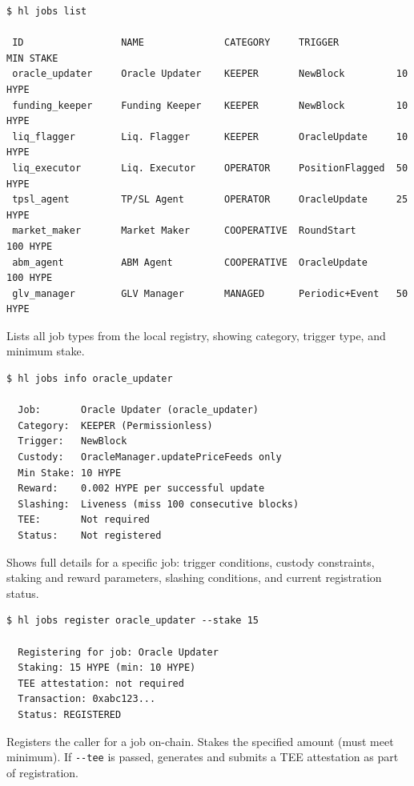 \documentclass[11pt,a4paper]{article}
\begin{document}
\begin{clibox}
\begin{lstlisting}
$ hl jobs list

 ID                 NAME              CATEGORY     TRIGGER          MIN STAKE
 oracle_updater     Oracle Updater    KEEPER       NewBlock         10 HYPE
 funding_keeper     Funding Keeper    KEEPER       NewBlock         10 HYPE
 liq_flagger        Liq. Flagger      KEEPER       OracleUpdate     10 HYPE
 liq_executor       Liq. Executor     OPERATOR     PositionFlagged  50 HYPE
 tpsl_agent         TP/SL Agent       OPERATOR     OracleUpdate     25 HYPE
 market_maker       Market Maker      COOPERATIVE  RoundStart       100 HYPE
 abm_agent          ABM Agent         COOPERATIVE  OracleUpdate     100 HYPE
 glv_manager        GLV Manager       MANAGED      Periodic+Event   50 HYPE
\end{lstlisting}
Lists all job types from the local registry, showing category, trigger type, and minimum stake.
\end{clibox}

\begin{clibox}
\begin{lstlisting}
$ hl jobs info oracle_updater

  Job:       Oracle Updater (oracle_updater)
  Category:  KEEPER (Permissionless)
  Trigger:   NewBlock
  Custody:   OracleManager.updatePriceFeeds only
  Min Stake: 10 HYPE
  Reward:    0.002 HYPE per successful update
  Slashing:  Liveness (miss 100 consecutive blocks)
  TEE:       Not required
  Status:    Not registered
\end{lstlisting}
Shows full details for a specific job: trigger conditions, custody constraints,
staking and reward parameters, slashing conditions, and current registration status.
\end{clibox}

\begin{clibox}
\begin{lstlisting}
$ hl jobs register oracle_updater --stake 15

  Registering for job: Oracle Updater
  Staking: 15 HYPE (min: 10 HYPE)
  TEE attestation: not required
  Transaction: 0xabc123...
  Status: REGISTERED
\end{lstlisting}
Registers the caller for a job on-chain. Stakes the specified amount (must meet
minimum). If \texttt{-{}-tee} is passed, generates and submits a TEE attestation
as part of registration.
\end{clibox}
\end{document}
